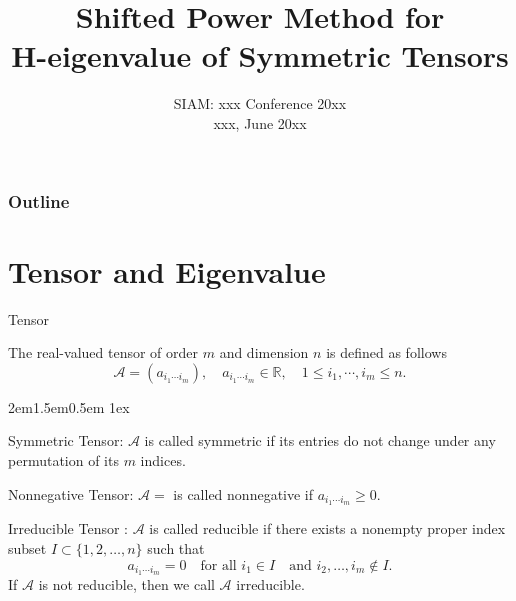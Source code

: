\documentclass[10pt,compress,t,noamsthm,notheorem,table,handout]{beamer}
\newcommand{\Bullet}{{\fontsize{6pt}{6pt}\selectfont\CircleSolid}}
\newcommand{\zhu}{{\color{blue!40}\Bullet}}
\newenvironment{blist}%
    {\begin{list}{{\hfill\raisebox{1.12pt}{\color{blue!60}\zhu}}}{%
     \leftmargin2em\labelwidth1.5em\labelsep0.5em
     \itemsep1ex\itemindent0pt\parsep0pt\topsep0pt}}
    {\end{list}}
\theoremstyle{nonumberbreak}%
\newcommand{\myem}[2][blue]{{\color{#1} #2}}
\newcommand{\mycite}[1]{\textcolor{red}{\normalfont\upshape{#1}}}
\newcommand{\A}{\mathcal{A}}
\begin{document}
\title{\LARGE %
  Shifted Power Method for\\ H-eigenvalue of Symmetric Tensors}


\date{SIAM: xxx Conference 20xx \\ xxx, June 20xx}

\begin{frame}[plain]
  \titlepage
\end{frame}

\begin{frame}
  \frametitle{Outline}
   \tableofcontents[hideallsubsections] %
\end{frame}

\section{Tensor and Eigenvalue}

\begin{frame}{Tensor}

The real-valued tensor of order $m$ and dimension $n$
is defined as follows
$$ \A=(a_{i_1\cdots i_m}),\quad a_{i_1\cdots i_m}\in \mathbb{R},
   \quad 1\leq i_1,\cdots,i_m\leq n.
$$

\begin{blist}
\item \myem{Symmetric Tensor}:
 $\A$ is called \myem{symmetric} if its entries do not change
under any permutation of its $m$ indices.\medskip

\item \myem{Nonnegative Tensor}:
$\A=$ is called \myem{nonnegative} if $a_{i_1\cdots i_m} \geq 0 .$
\medskip

\item \myem{Irreducible Tensor \mycite{[CPZ '08]}}:
$\A$ is called \myem{reducible}
if there exists a nonempty proper index subset
$I\subset\{1,2,\ldots,n\}$ such that
$$ a_{i_1\cdots i_m}=0 \quad\text{for all } i_1\in I
  \quad\text{and } i_2,\ldots,i_m\notin I.
$$
If $\A$ is not reducible, then we call $\A$ \myem{irreducible}.
\end{blist}

\end{frame}
\end{document}
